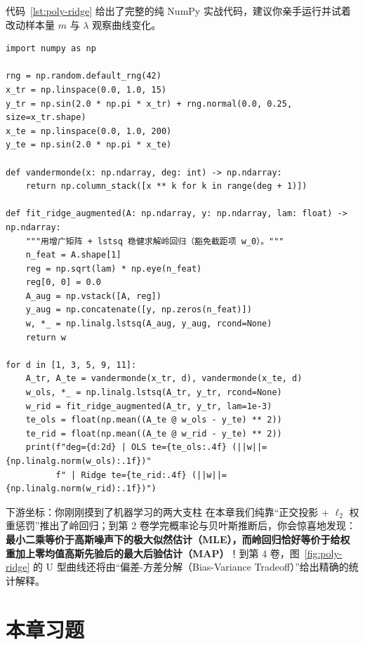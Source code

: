 代码~\ref{lst:poly-ridge} 给出了完整的纯 NumPy 实战代码，建议你亲手运行并试着改动样本量 $m$ 与 $\lambda$ 观察曲线变化。

\begin{lstlisting}[caption={多项式 OLS 与岭回归实战闭环（复现表~\ref{tab:poly-ridge} 实测数据）}, label={lst:poly-ridge}]
import numpy as np

rng = np.random.default_rng(42)
x_tr = np.linspace(0.0, 1.0, 15)
y_tr = np.sin(2.0 * np.pi * x_tr) + rng.normal(0.0, 0.25, size=x_tr.shape)
x_te = np.linspace(0.0, 1.0, 200)
y_te = np.sin(2.0 * np.pi * x_te)

def vandermonde(x: np.ndarray, deg: int) -> np.ndarray:
    return np.column_stack([x ** k for k in range(deg + 1)])

def fit_ridge_augmented(A: np.ndarray, y: np.ndarray, lam: float) -> np.ndarray:
    """用增广矩阵 + lstsq 稳健求解岭回归（豁免截距项 w_0）。"""
    n_feat = A.shape[1]
    reg = np.sqrt(lam) * np.eye(n_feat)
    reg[0, 0] = 0.0
    A_aug = np.vstack([A, reg])
    y_aug = np.concatenate([y, np.zeros(n_feat)])
    w, *_ = np.linalg.lstsq(A_aug, y_aug, rcond=None)
    return w

for d in [1, 3, 5, 9, 11]:
    A_tr, A_te = vandermonde(x_tr, d), vandermonde(x_te, d)
    w_ols, *_ = np.linalg.lstsq(A_tr, y_tr, rcond=None)
    w_rid = fit_ridge_augmented(A_tr, y_tr, lam=1e-3)
    te_ols = float(np.mean((A_te @ w_ols - y_te) ** 2))
    te_rid = float(np.mean((A_te @ w_rid - y_te) ** 2))
    print(f"deg={d:2d} | OLS te={te_ols:.4f} (||w||={np.linalg.norm(w_ols):.1f})"
          f" | Ridge te={te_rid:.4f} (||w||={np.linalg.norm(w_rid):.1f})")
\end{lstlisting}

\begin{insightBox}{下游坐标：你刚刚摸到了机器学习的两大支柱}
在本章我们纯靠“正交投影 + $\ell_2$ 权重惩罚”推出了岭回归；到第 2 卷学完概率论与贝叶斯推断后，你会惊喜地发现：\textbf{最小二乘等价于高斯噪声下的极大似然估计（MLE），而岭回归恰好等价于给权重加上零均值高斯先验后的最大后验估计（MAP）}！到第 4 卷，图~\ref{fig:poly-ridge} 的 U 型曲线还将由“偏差-方差分解（Bias-Variance Tradeoff）”给出精确的统计解释。
\end{insightBox}

\section{本章习题}\label{sec:ch02-exercises}


